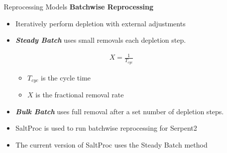 \documentclass[final]{beamer}
\newlength{\sepwid}
\newlength{\onecolwid}
\newlength{\threecolwid}
\begin{document}
\begin{frame}[t]
\begin{columns}[t,totalwidth=\threecolwid]
\begin{column}{\onecolwid}
\end{column} %

\begin{column}{\sepwid}\end{column} %



\begin{column}{\onecolwid} %

\begin{block}{Reprocessing Models}
\vspace{0.7em}
\textbf{Batchwise Reprocessing}

\begin{itemize}
        \item Iteratively perform depletion with external adjustments
	\item \textbf{\emph{Steady Batch}} uses small removals each depletion step.

\begin{align}
	X = \frac{1}{T_{cyc}}
\end{align}
	\begin{itemize}
		\item $T_{cyc}$ is the cycle time
		\item $X$ is the fractional removal rate
	\end{itemize}

	\item \textbf{\emph{Bulk Batch}} uses full removal after a set number of depletion steps.
	\item SaltProc is used to run batchwise reprocessing for Serpent2
	\item The current version of SaltProc uses the Steady Batch method
\end{itemize}



\end{block}
\end{column}
\end{columns}
\end{frame}
\end{document}
